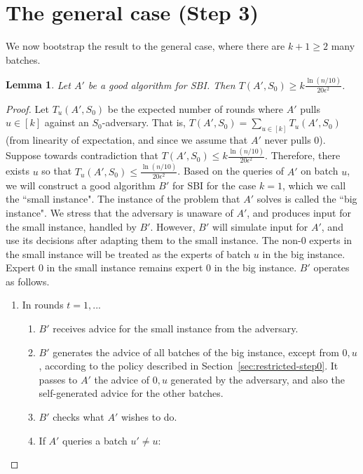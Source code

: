 \documentclass[a4paper,11pt]{article}
\newtheorem{lemma}[theorem]{Lemma}
\theoremstyle{definition}
\begin{document}
\section{The general case (Step 3)} \label{sec:one-to-many}
We now bootstrap the result to the general case, where there are $k+1 \geq 2$ many batches.

\begin{lemma} \label{lem:many-batches-lower-bound}
    Let $A'$ be a good algorithm for SBI. Then $T(A', S_0) \geq k \frac{\ln(n/10)}{20 \epsilon^2}$.
\end{lemma}

\begin{proof}
    Let $T_u(A',S_0)$ be the expected number of rounds where $A'$ pulls $u \in [k]$ against an $S_0$-adversary. That is, $T(A', S_0) = \sum_{u \in [k]} T_u(A',S_0)$ (from linearity of expectation, and since we assume that $A'$ never pulls $0$). Suppose towards contradiction that $T(A', S_0) \leq k \frac{\ln(n/10)}{20 \epsilon^2}$.  Therefore, there exists $u$ so that $T_u(A',S_0) \leq  \frac{\ln(n/10)}{20 \epsilon^2}$. Based on the queries of $A'$ on batch $u$, we will construct a good algorithm $B'$ for SBI for the case $k=1$, which we call the ``small instance". The instance of the problem that $A'$ solves is called the ``big instance". We stress that the adversary is unaware of $A'$, and produces input for the small instance, handled by $B'$. However, $B'$ will simulate input for $A'$, and use its decisions after adapting them to the small instance. The non-$0$ experts in the small instance will be treated as the experts of batch $u$ in the big instance. Expert $0$ in the small instance remains expert $0$ in the big instance. $B'$ operates as follows.
    \begin{enumerate}
        \item In rounds $t= 1,...$
        \begin{enumerate}
            \item $B'$ receives advice for the small instance from the adversary. 
            \item $B'$ generates the advice of all batches of the big instance, except from $0, u$, according to the policy described in Section~\ref{sec:restricted-step0}. It passes to $A'$ the advice of $0, u$ generated by the adversary, and also the self-generated advice for the other batches.
            \item \label{itm:loop-start} $B'$ checks what $A'$ wishes to do.
            \item If $A'$ queries a batch $u' \neq u$: 

\end{enumerate}
\end{enumerate}
\end{proof}
\end{document}
